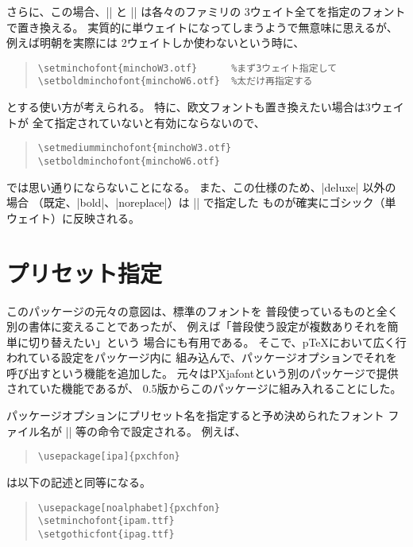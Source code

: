 \documentclass[a4paper,uplatex]{jsarticle}
\newcommand{\Pkg}[1]{\textsf{#1}}
\providecommand{\pTeX}{p\TeX}
\begin{document}
さらに、この場合、|\setminchofont| と |\setgothicfont| は各々のファミリの
3ウェイト全てを指定のフォントで置き換える。
実質的に単ウェイトになってしまうようで無意味に思えるが、
例えば明朝を実際には 2ウェイトしか使わないという時に、
\begin{quote}\small\begin{verbatim}
\setminchofont{minchoW3.otf}      %まず3ウェイト指定して
\setboldminchofont{minchoW6.otf}  %太だけ再指定する
\end{verbatim}\end{quote}
とする使い方が考えられる。
特に、欧文フォントも置き換えたい場合は3ウェイトが
全て指定されていないと有効にならないので、
\begin{quote}\small\begin{verbatim}
\setmediumminchofont{minchoW3.otf}
\setboldminchofont{minchoW6.otf}
\end{verbatim}\end{quote}
では思い通りにならないことになる。
また、この仕様のため、|deluxe| 以外の場合
（既定、|bold|、|noreplace|）は |\setgothicfont| で指定した
ものが確実にゴシック（単ウェイト）に反映される。

\section{プリセット指定}

このパッケージの元々の意図は、標準のフォントを
普段使っているものと全く別の書体に変えることであったが、
例えば「普段使う設定が複数ありそれを簡単に切り替えたい」という
場合にも有用である。
そこで、{\pTeX}において広く行われている設定をパッケージ内に
組み込んで、パッケージオプションでそれを呼び出すという機能を追加した。
元々は\Pkg{PXjafont}という別のパッケージで提供されていた機能であるが、
0.5版からこのパッケージに組み入れることにした。

パッケージオプションにプリセット名を指定すると予め決められたフォント
ファイル名が |\setminchofont| 等の命令で設定される。
例えば、
\begin{quote}\small\begin{verbatim}
\usepackage[ipa]{pxchfon}
\end{verbatim}\end{quote}
は以下の記述と同等になる。
\begin{quote}\small\begin{verbatim}
\usepackage[noalphabet]{pxchfon}
\setminchofont{ipam.ttf}
\setgothicfont{ipag.ttf}
\end{verbatim}\end{quote}
\end{document}
